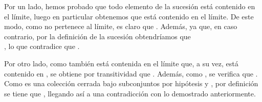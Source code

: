 \begin{isabellebody}
\begin{isamarkuptext}
\begin{demostracion}
    Por un lado, hemos probado que todo elemento de la sucesión está contenido en el límite, luego 
    en particular obtenemos que  está contenido en el límite. De este modo, como  no 
    pertenece al límite, es claro que . Además,  ya que, en caso contrario, 
    por la definición  de la sucesión obtendríamos que\\ , lo que contradice 
    que . 

    Por otro lado, como  también está contenida en el límite que, a su vez, está contenido en 
    , se obtiene por transitividad que . Además, como , se verifica que 
    . Como  es una colección cerrada bajo subconjuntos por hipótesis y , 
    por definición se tiene que , llegando así a una contradicción con lo demostrado 
    anteriormente.
  \end{demostracion}


\end{isamarkuptext}
\end{isabellebody}
